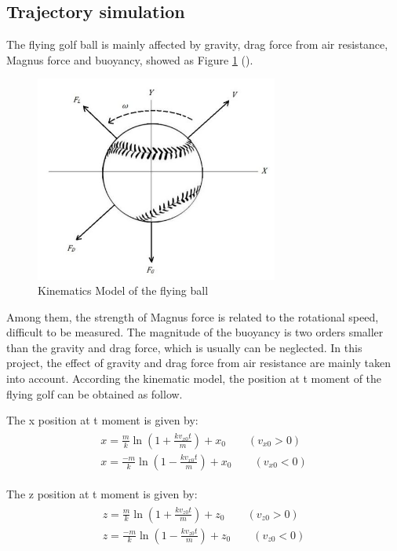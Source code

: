 \subsection{Trajectory simulation}
The flying golf ball is mainly affected by gravity, drag force from air resistance, Magnus force and buoyancy, showed as Figure \ref{fig:model2} (\cite{martin2012evaluation}). 
\begin{figure}[H]
    \centering
    \includegraphics[width=8cm]{figure/KM.png}
    \caption{Kinematics Model of the flying ball}
    \label{fig:model2}
\end{figure}
Among them, the strength of Magnus force is related to the rotational speed, difficult to be measured. The magnitude of the buoyancy is two orders smaller than the gravity and drag force, which is usually can be neglected. In this project, the effect of gravity and drag force from air resistance are mainly taken into account. According the kinematic model, the position at t moment of the flying golf can be obtained as follow.

The x position at t moment is given by:
\begin{align}
\begin{split}
  x=\frac{m}{k} \ln \left(1+\frac{k v_{x 0} t}{m}\right)+x_{0} \qquad(v_{x 0}>0)\\ 
  x=\frac{-m}{k} \ln \left(1-\frac{k v_{x 0} t}{m}\right)+x_{0} \qquad(v_{x 0}<0)
\end{split}
\end{align}

The z position at t moment is given by:
\begin{align}
\begin{split}
 z=\frac{m}{k} \ln \left(1+\frac{k v_{z 0} t}{m}\right)+z_{0}  \qquad(v_{z 0}>0)\\ 
z=\frac{-m}{k} \ln \left(1-\frac{k v_{z 0} t}{m}\right)+z_{0} \qquad(v_{z 0}<0)
\end{split}
\end{align}

